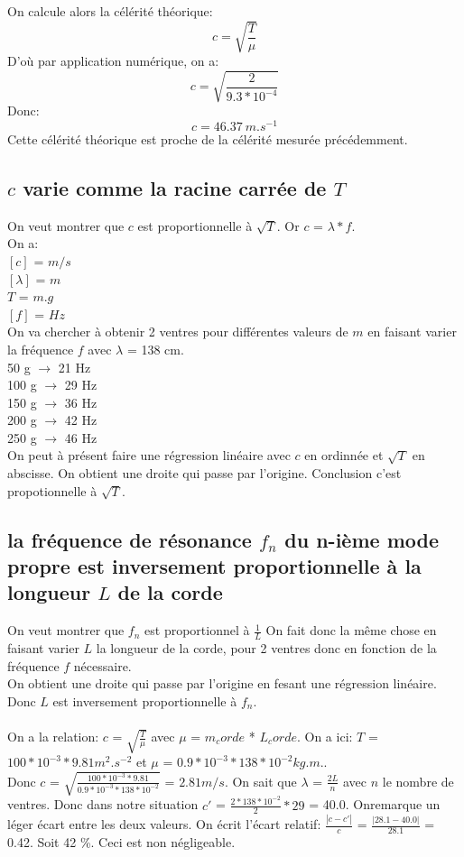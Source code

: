 \documentclass{scrartcl}
\begin{document}
		On calcule alors la célérité théorique:
		$$c=\sqrt{\frac{T}{\mu}}$$
		D'où par application numérique, on a:
		$$c=\sqrt{\frac{2}{9.3*10^{-4}}}$$
		Donc:
		$$c=46.37\ m.s^{-1}$$
		Cette célérité théorique est proche de la célérité mesurée précédemment.
				
		\subsection{$c$ varie comme la racine carrée de $T$}
		
		On veut montrer que $c$ est proportionnelle à $\sqrt{T}$. Or $c$ = $\lambda * f$.\\
		On a:\\
		$[c]$ = $m/s$\\
		$[\lambda]$ = $m$\\
		$T$ = $m.g$\\
		$[f]$ = $Hz$\\
		On va chercher à obtenir 2 ventres pour différentes valeurs de $m$ en faisant varier la fréquence $f$ avec $\lambda$ = 138 cm.\\
		50 g $\rightarrow$ 21 Hz\\
		100 g $\rightarrow$ 29 Hz\\
		150 g $\rightarrow$ 36 Hz\\
		200 g $\rightarrow$ 42 Hz\\
		250 g $\rightarrow$ 46 Hz\\
		On peut à présent faire une régression linéaire avec $c$ en ordinnée et $\sqrt{T}$ en abscisse. On obtient une droite qui passe par l'origine. Conclusion c'est propotionnelle à $\sqrt{T}$.
				
		\subsection{la fréquence de résonance $f_n$ du n-ième mode propre est inversement proportionnelle à la longueur $L$ de la corde}

		On veut montrer que $f_n$ est proportionnel à $\frac{1}{L}$
		On fait donc la même chose en faisant varier $L$ la longueur de la corde, pour 2 ventres donc en fonction de la fréquence $f$ nécessaire.\\
		On obtient une droite qui passe par l'origine en fesant une régression linéaire. Donc $L$ est inversement proportionnelle à $f_n$.\\\\
		
		On a la relation: $c$ = $\sqrt{\frac{T}{\mu}}$ avec $\mu$ = $m_corde$ * $L_corde$. On a ici: $T$ = $100 * 10^{-3} * 9.81 m^2.s^{-2}$ et $\mu$ = $0.9 * 10^{-3}*138 * 10^{-2} kg.m.$.\\
		Donc $c$ = $\sqrt{\frac{100 * 10^{-3} * 9.81}{0.9 * 10^{-3}*138 * 10^{-2}}}$ = $2.81 m/s$. On sait que $\lambda$ = $\frac{2L}{n}$ avec $n$ le nombre de ventres. Donc dans notre situation $c'$ = $\frac{2*138*10^{-2}}{2}*29$ = 40.0. Onremarque un léger écart entre les deux valeurs. On écrit l'écart relatif: $\frac{|c-c'|}{c}$ = $\frac{|28.1-40.0|}{28.1}$ = 0.42. Soit 42 \%. Ceci est non négligeable.  
\end{document}
